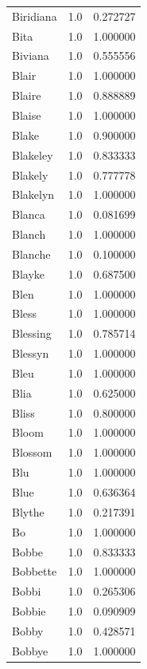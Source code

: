 \documentclass[
  letterpaper,
  DIV=11,
  numbers=noendperiod]{scrreprt}
\begin{document}
\begin{tabular}{lrr}
Biridiana       &   1.0 &   0.272727 \\
Bita            &   1.0 &   1.000000 \\
Biviana         &   1.0 &   0.555556 \\
Blair           &   1.0 &   1.000000 \\
Blaire          &   1.0 &   0.888889 \\
Blaise          &   1.0 &   1.000000 \\
Blake           &   1.0 &   0.900000 \\
Blakeley        &   1.0 &   0.833333 \\
Blakely         &   1.0 &   0.777778 \\
Blakelyn        &   1.0 &   1.000000 \\
Blanca          &   1.0 &   0.081699 \\
Blanch          &   1.0 &   1.000000 \\
Blanche         &   1.0 &   0.100000 \\
Blayke          &   1.0 &   0.687500 \\
Blen            &   1.0 &   1.000000 \\
Bless           &   1.0 &   1.000000 \\
Blessing        &   1.0 &   0.785714 \\
Blessyn         &   1.0 &   1.000000 \\
Bleu            &   1.0 &   1.000000 \\
Blia            &   1.0 &   0.625000 \\
Bliss           &   1.0 &   0.800000 \\
Bloom           &   1.0 &   1.000000 \\
Blossom         &   1.0 &   1.000000 \\
Blu             &   1.0 &   1.000000 \\
Blue            &   1.0 &   0.636364 \\
Blythe          &   1.0 &   0.217391 \\
Bo              &   1.0 &   1.000000 \\
Bobbe           &   1.0 &   0.833333 \\
Bobbette        &   1.0 &   1.000000 \\
Bobbi           &   1.0 &   0.265306 \\
Bobbie          &   1.0 &   0.090909 \\
Bobby           &   1.0 &   0.428571 \\
Bobbye          &   1.0 &   1.000000 \\

\end{tabular}
\end{document}
